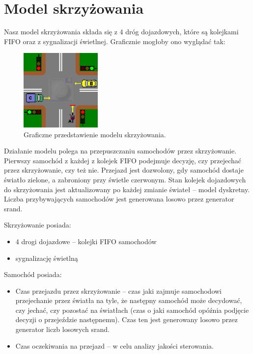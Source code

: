 \documentclass[11pt]{aghdpl}
\author{Żaneta Błaszczuk, Rafał Kozik, Filip Kubicz, Jakub Nowak, Jakub Porębski}
\date{2014}
\begin{document}
\titlepages

\section{Model skrzyżowania}
Nasz model skrzyżowania składa się z 4 dróg dojazdowych, które są kolejkami FIFO oraz z sygnalizacji świetlnej. Graficznie mogłoby ono wyglądać tak: 

\begin{figure}[h!]
	\centering
	\includegraphics[width=40mm]{model.png}
	\caption{Graficzne przedstawienie modelu skrzyżowania.}	
	\label{model}
\end{figure} 

Działanie modelu polega na przepuszczaniu samochodów przez skrzyżowanie.  Pierwszy samochód z każdej z kolejek FIFO podejmuje decyzję, czy przejechać przez skrzyżowanie, czy też nie. Przejazd jest dozwolony, gdy  samochód dostaje światło zielone, a zabroniony przy świetle czerwonym.
Stan kolejek dojazdowych do skrzyżowania jest aktualizowany po każdej zmianie świateł -- model dyskretny. Liczba przybywających samochodów jest generowana losowo przez generator srand.

Skrzyżowanie posiada:
\begin{itemize}
	\item 4 drogi dojazdowe -- kolejki FIFO samochodów
	\item sygnalizację świetlną
\end{itemize}

Samochód posiada:
\begin{itemize}
	\item Czas przejazdu przez skrzyżowanie -- czas jaki zajmuje samochodowi przejechanie przez światła na tyle, że następny samochód może decydować, czy jechać, czy pozostać na światłach (czas o jaki samochód opóźnia podjęcie decyzji o przejeździe następnemu).
	Czas ten jest generowany losowo przez generator liczb losowych srand.
	\item Czas oczekiwania na przejazd -- w celu analizy jakości sterowania.
\end{itemize}
\end{document}
